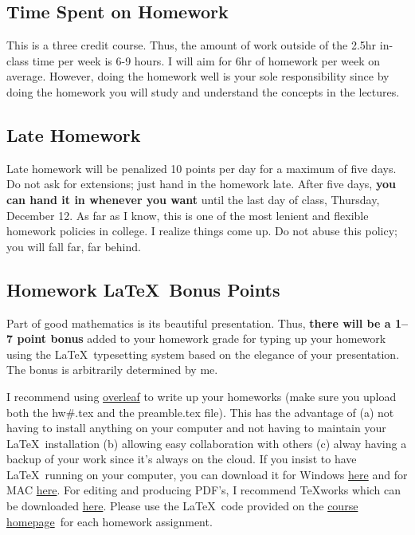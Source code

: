 \documentclass[12pt]{article}
\newcommand{\ingreen}[1]{\color{green}\textbf{#1} \color{black}}
\newcommand{\coursewebpage}{\href{https://github.com/kapelner/QC_Math_621_Fall_2019}{course homepage}}
\begin{document}
\subsection*{Time Spent on Homework }

This is a three credit course. Thus, the amount of work outside of the 2.5hr in-class time per week is 6-9 hours. I will aim for 6hr of homework per week on average. However, doing the homework well is your sole responsibility since by doing the homework you will study and understand the concepts in the lectures.

\subsection*{Late Homework}

Late homework will be penalized 10 points per day for a maximum of five days. Do not ask for extensions; just hand in the homework late. After five days, \textbf{you can hand it in whenever you want} until the last day of class, Thursday, December 12. As far as I know, this is one of the most lenient and flexible homework policies in college. I realize things come up. Do not abuse this policy; you will fall far, far behind.

\subsection*{Homework \LaTeX~Bonus Points}

Part of good mathematics is its beautiful presentation. Thus, \ingreen{there will be a 1--7 point bonus} added to your homework grade  for typing up your homework using the \LaTeX ~typesetting system based on the elegance of your presentation. The bonus is arbitrarily determined by me.

I recommend using \href{http://overleaf.com}{overleaf} to write up your homeworks (make sure you upload both the hw\#.tex and the preamble.tex file). This has the advantage of (a) not having to install anything on your computer and not having to maintain your \LaTeX ~installation (b) allowing easy collaboration with others (c) alway having a backup of your work since it's always on the cloud. If you insist to have \LaTeX ~running on your computer, you can download it for Windows \href{http://www.miktex.org/download}{here} and for MAC \href{http://www.tug.org/mactex/}{here}. For editing and producing PDF's, I recommend \TeX works which can be downloaded \href{http://www.tug.org/texworks/#Getting_TeXworks}{here}. Please use the \LaTeX ~code provided on the \coursewebpage ~for each homework assignment. 
\end{document}
